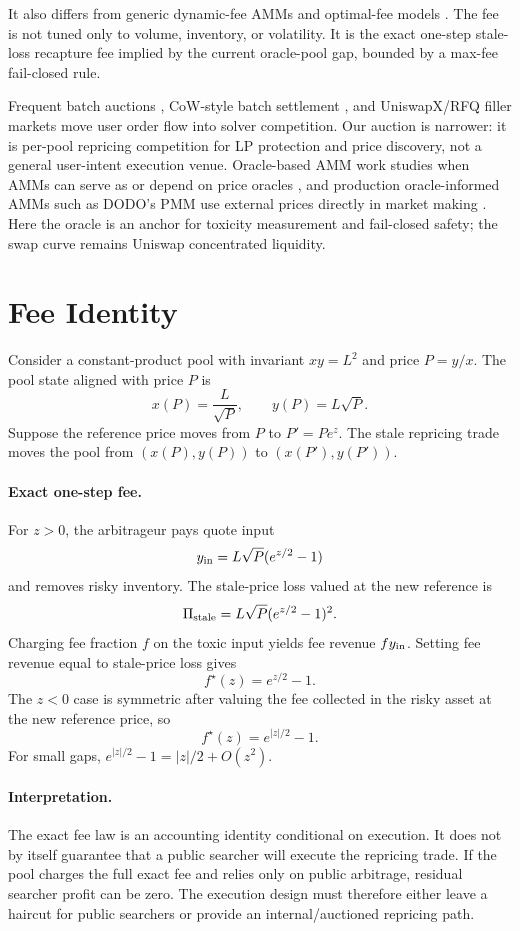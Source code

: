 \documentclass[11pt]{article}
\begin{document}
It also differs from generic dynamic-fee AMMs and optimal-fee models \cite{baggiani-dynamic-fees}. The fee is not tuned only to volume, inventory, or volatility. It is the exact one-step stale-loss recapture fee implied by the current oracle-pool gap, bounded by a max-fee fail-closed rule.

Frequent batch auctions \cite{budish-batch}, CoW-style batch settlement \cite{cow-protocol}, and UniswapX/RFQ filler markets \cite{uniswapx} move user order flow into solver competition. Our auction is narrower: it is per-pool repricing competition for LP protection and price discovery, not a general user-intent execution venue. Oracle-based AMM work studies when AMMs can serve as or depend on price oracles \cite{angeris-oracles}, and production oracle-informed AMMs such as DODO's PMM use external prices directly in market making \cite{dodo-pmm}. Here the oracle is an anchor for toxicity measurement and fail-closed safety; the swap curve remains Uniswap concentrated liquidity.

\section{Fee Identity}

Consider a constant-product pool with invariant $xy=L^2$ and price $P=y/x$. The pool state aligned with price $P$ is
\[
  x(P)=\frac{L}{\sqrt{P}}, \qquad y(P)=L\sqrt{P}.
\]
Suppose the reference price moves from $P$ to $P'=Pe^z$. The stale repricing trade moves the pool from $(x(P),y(P))$ to $(x(P'),y(P'))$.

\paragraph{Exact one-step fee.}
For $z>0$, the arbitrageur pays quote input
\[
  y_{\rm in}=L\sqrt{P}(e^{z/2}-1)
\]
and removes risky inventory. The stale-price loss valued at the new reference is
\[
  \Pi_{\rm stale}=L\sqrt{P}(e^{z/2}-1)^2.
\]
Charging fee fraction $f$ on the toxic input yields fee revenue $f y_{\rm in}$. Setting fee revenue equal to stale-price loss gives
\[
  f^\star(z)=e^{z/2}-1.
\]
The $z<0$ case is symmetric after valuing the fee collected in the risky asset at the new reference price, so
\[
  f^\star(z)=e^{|z|/2}-1.
\]
For small gaps, $e^{|z|/2}-1=|z|/2+O(z^2)$.

\paragraph{Interpretation.}
The exact fee law is an accounting identity conditional on execution. It does not by itself guarantee that a public searcher will execute the repricing trade. If the pool charges the full exact fee and relies only on public arbitrage, residual searcher profit can be zero. The execution design must therefore either leave a haircut for public searchers or provide an internal/auctioned repricing path.
\end{document}
